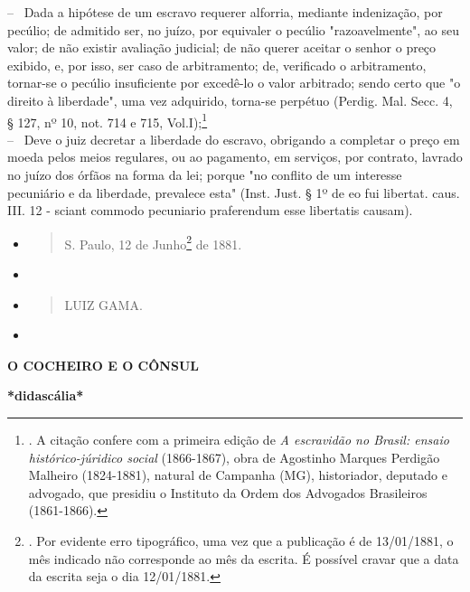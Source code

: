 -- ~Dada a hipótese de um escravo requerer alforria, mediante
indenização, por pecúlio; de admitido ser, no juízo, por equivaler o
pecúlio "razoavelmente", ao seu valor; de não existir avaliação
judicial; de não querer aceitar o senhor o preço exibido, e, por isso,
ser caso de arbitramento; de, verificado o arbitramento, tornar-se o
pecúlio insuficiente por excedê-lo o valor arbitrado; sendo certo que "o
direito à liberdade", uma vez adquirido, torna-se perpétuo (Perdig. Mal.
Secc. 4, § 127, nº 10, not. 714 e 715, Vol.I);\footnote{. A citação
  confere com a primeira edição de \emph{A escravidão no Brasil: ensaio
  histórico-júridico social} (1866-1867), obra de Agostinho Marques
  Perdigão Malheiro (1824-1881), natural de Campanha (MG), historiador,
  deputado e advogado, que presidiu o Instituto da Ordem dos Advogados
  Brasileiros (1861-1866).}\\
-- ~Deve o juiz decretar a liberdade do escravo, obrigando a completar o
preço em moeda pelos meios regulares, ou ao pagamento, em serviços, por
contrato, lavrado no juízo dos órfãos na forma da lei; porque "no
conflito de um interesse pecuniário e da liberdade, prevalece esta"
(Inst. Just. § 1º de eo fui libertat. caus. III. 12 - sciant commodo
pecuniario praferendum esse libertatis causam).

\begin{itemize}
\item
  \begin{quote}
  S. Paulo, 12 de Junho\footnote{. Por evidente erro tipográfico, uma
    vez que a publicação é de 13/01/1881, o mês indicado não corresponde
    ao mês da escrita. É possível cravar que a data da escrita seja o
    dia 12/01/1881.} de
  1881.
  \end{quote}
\item
\item
  \begin{quote}
  LUIZ GAMA.
  \end{quote}
\item
\end{itemize}

\textbf{O COCHEIRO E O
CÔNSUL}

\textbf{*didascália*}

